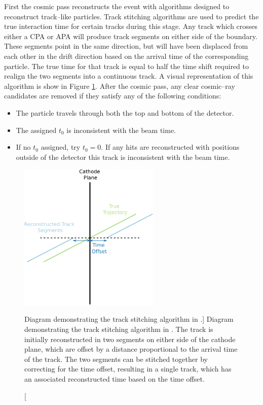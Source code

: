 First the cosmic pass reconstructs the event with algorithms designed to 
reconstruct track--like particles. Track stitching algorithms are used to
predict the true interaction time for certain tracks during this stage. Any 
track which crosses either a CPA or APA will produce track segments on either 
side of the boundary. These segments point in the same direction, but will 
have been displaced from each other in the drift direction based on the 
arrival time of the corresponding particle. The true time for that track is 
equal to half the time shift required to realign the two segments into a 
continuous track. A visual representation of this algorithm is show in Figure 
\ref{fig:track_stitching}. After the cosmic pass, any clear cosmic--ray 
candidates are removed if they satisfy any of the following 
conditions\cite{protoduneperf}:
\begin{itemize}
	\item The particle travels through both the top and bottom of the detector.
	\item The assigned $t_0$ is inconsistent with the beam time.
	\item If no $t_0$ assigned, try $t_0 = 0$. If any hits are reconstructed 
		with positions outside of the detector this track is inconsistent with the 
		beam time.
\end{itemize}

\begin{figure}
	\centering
	\includegraphics[width=0.6\textwidth]{figures/track_stitch.pdf}
	\caption
	[Diagram demonstrating the track stitching algorithm in \protodune{}.]
	{Diagram demonstrating the track stitching algorithm in \protodune{}. The
	track is initially reconstructed in two segments on either side of the cathode
	plane, which are offset by a distance proportional to the arrival time of the
	track. The two segments can be stitched together by correcting for the time
	offset, resulting in a single track, which has an associated reconstructed
	time based on the time offset.}
	\label{fig:track_stitching}
\end{figure}

